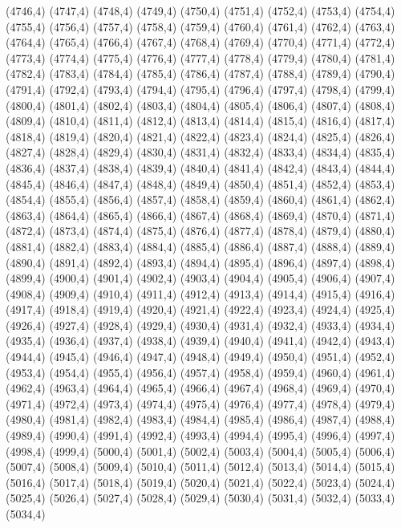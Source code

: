 (4746,4)
(4747,4)
(4748,4)
(4749,4)
(4750,4)
(4751,4)
(4752,4)
(4753,4)
(4754,4)
(4755,4)
(4756,4)
(4757,4)
(4758,4)
(4759,4)
(4760,4)
(4761,4)
(4762,4)
(4763,4)
(4764,4)
(4765,4)
(4766,4)
(4767,4)
(4768,4)
(4769,4)
(4770,4)
(4771,4)
(4772,4)
(4773,4)
(4774,4)
(4775,4)
(4776,4)
(4777,4)
(4778,4)
(4779,4)
(4780,4)
(4781,4)
(4782,4)
(4783,4)
(4784,4)
(4785,4)
(4786,4)
(4787,4)
(4788,4)
(4789,4)
(4790,4)
(4791,4)
(4792,4)
(4793,4)
(4794,4)
(4795,4)
(4796,4)
(4797,4)
(4798,4)
(4799,4)
(4800,4)
(4801,4)
(4802,4)
(4803,4)
(4804,4)
(4805,4)
(4806,4)
(4807,4)
(4808,4)
(4809,4)
(4810,4)
(4811,4)
(4812,4)
(4813,4)
(4814,4)
(4815,4)
(4816,4)
(4817,4)
(4818,4)
(4819,4)
(4820,4)
(4821,4)
(4822,4)
(4823,4)
(4824,4)
(4825,4)
(4826,4)
(4827,4)
(4828,4)
(4829,4)
(4830,4)
(4831,4)
(4832,4)
(4833,4)
(4834,4)
(4835,4)
(4836,4)
(4837,4)
(4838,4)
(4839,4)
(4840,4)
(4841,4)
(4842,4)
(4843,4)
(4844,4)
(4845,4)
(4846,4)
(4847,4)
(4848,4)
(4849,4)
(4850,4)
(4851,4)
(4852,4)
(4853,4)
(4854,4)
(4855,4)
(4856,4)
(4857,4)
(4858,4)
(4859,4)
(4860,4)
(4861,4)
(4862,4)
(4863,4)
(4864,4)
(4865,4)
(4866,4)
(4867,4)
(4868,4)
(4869,4)
(4870,4)
(4871,4)
(4872,4)
(4873,4)
(4874,4)
(4875,4)
(4876,4)
(4877,4)
(4878,4)
(4879,4)
(4880,4)
(4881,4)
(4882,4)
(4883,4)
(4884,4)
(4885,4)
(4886,4)
(4887,4)
(4888,4)
(4889,4)
(4890,4)
(4891,4)
(4892,4)
(4893,4)
(4894,4)
(4895,4)
(4896,4)
(4897,4)
(4898,4)
(4899,4)
(4900,4)
(4901,4)
(4902,4)
(4903,4)
(4904,4)
(4905,4)
(4906,4)
(4907,4)
(4908,4)
(4909,4)
(4910,4)
(4911,4)
(4912,4)
(4913,4)
(4914,4)
(4915,4)
(4916,4)
(4917,4)
(4918,4)
(4919,4)
(4920,4)
(4921,4)
(4922,4)
(4923,4)
(4924,4)
(4925,4)
(4926,4)
(4927,4)
(4928,4)
(4929,4)
(4930,4)
(4931,4)
(4932,4)
(4933,4)
(4934,4)
(4935,4)
(4936,4)
(4937,4)
(4938,4)
(4939,4)
(4940,4)
(4941,4)
(4942,4)
(4943,4)
(4944,4)
(4945,4)
(4946,4)
(4947,4)
(4948,4)
(4949,4)
(4950,4)
(4951,4)
(4952,4)
(4953,4)
(4954,4)
(4955,4)
(4956,4)
(4957,4)
(4958,4)
(4959,4)
(4960,4)
(4961,4)
(4962,4)
(4963,4)
(4964,4)
(4965,4)
(4966,4)
(4967,4)
(4968,4)
(4969,4)
(4970,4)
(4971,4)
(4972,4)
(4973,4)
(4974,4)
(4975,4)
(4976,4)
(4977,4)
(4978,4)
(4979,4)
(4980,4)
(4981,4)
(4982,4)
(4983,4)
(4984,4)
(4985,4)
(4986,4)
(4987,4)
(4988,4)
(4989,4)
(4990,4)
(4991,4)
(4992,4)
(4993,4)
(4994,4)
(4995,4)
(4996,4)
(4997,4)
(4998,4)
(4999,4)
(5000,4)
(5001,4)
(5002,4)
(5003,4)
(5004,4)
(5005,4)
(5006,4)
(5007,4)
(5008,4)
(5009,4)
(5010,4)
(5011,4)
(5012,4)
(5013,4)
(5014,4)
(5015,4)
(5016,4)
(5017,4)
(5018,4)
(5019,4)
(5020,4)
(5021,4)
(5022,4)
(5023,4)
(5024,4)
(5025,4)
(5026,4)
(5027,4)
(5028,4)
(5029,4)
(5030,4)
(5031,4)
(5032,4)
(5033,4)
(5034,4)
